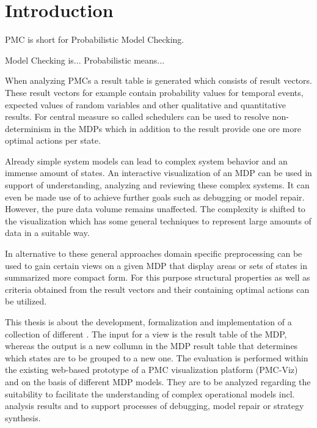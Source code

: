 \documentclass[preview]{standalone}
\begin{document}
\section{Introduction}
PMC is short for Probabilistic Model Checking.

Model Checking is...
Probabilistic means...

When analyzing PMCs a result table is generated which consists of result vectors. These result vectors for example contain probability values for temporal events, expected values of random variables and other qualitative and quantitative results. For central measure so called schedulers can be used to resolve non-determinism in the MDPs which in addition to the result provide one ore more optimal actions per state.

Already simple system models can lead to complex system behavior and an immense amount of states. An interactive visualization of an MDP can be used in support of understanding, analyzing and reviewing these complex systems. It can even be made use of to achieve further goals such as debugging or model repair. However, the pure data volume remains unaffected. The complexity is shifted to the visualization which has some general techniques to represent large amounts of data in a suitable way.


In alternative to these general approaches domain specific preprocessing can be used to gain certain views on a given MDP that display areas or sets of states in summarized more compact form. For this purpose structural properties as well as criteria obtained from the result vectors and their containing optimal actions can be utilized.


This thesis is about the development, formalization and implementation of a collection of different \emph{\viewsN}.
The input for a view is the result table of the MDP, whereas the output is a new collumn in the MDP result table that determines which states are to be grouped to a new one.
The evaluation is performed within the existing web-based prototype of a PMC visualization platform (PMC-Viz) and on the basis of different MDP models. They are to be analyzed regarding the suitability to facilitate the understanding of complex operational models incl. analysis results and to support processes of debugging, model repair or strategy synthesis.
\end{document}
